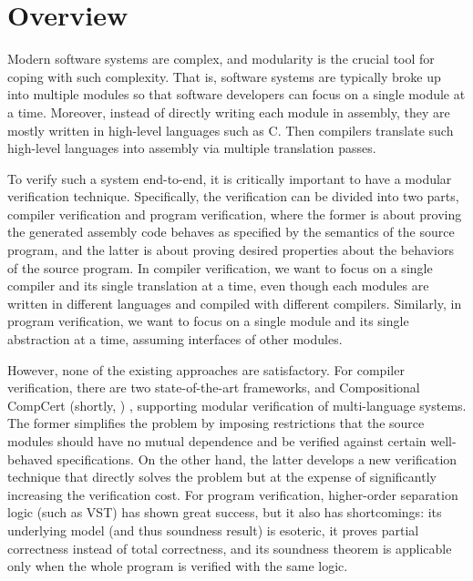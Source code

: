 \chapter{\;\;\;\;Overview}\label{sec:overview}


Modern software systems are complex, and modularity is the crucial tool for coping with such complexity.
That is, software systems are typically broke up into multiple modules so that software developers can focus on a single module at a time.
Moreover, instead of directly writing each module in assembly, they are mostly written in high-level languages such as C.
Then compilers translate such high-level languages into assembly via multiple translation passes.




To verify such a system end-to-end, it is critically important to have a modular verification technique.
Specifically, the verification can be divided into two parts, compiler verification and program verification,
where the former is about proving the generated assembly code behaves as specified by the semantics of the source program,
and the latter is about proving desired properties about the behaviors of the source program.
In compiler verification, we want to focus on a single compiler and its single translation at a time, even though each modules are written in different languages and compiled with different compilers.
Similarly, in program verification, we want to focus on a single module and its single abstraction at a time, assuming interfaces of other modules.




However, none of the existing approaches are satisfactory.
For compiler verification, there are two state-of-the-art frameworks, \ccx{} \cite{gu:dscal,wang:saccx} and Compositional CompCert (shortly, \ccc{}) \cite{beringer:isem,stewart:ccc},
supporting modular verification of multi-language systems. %
The former simplifies the problem by
imposing restrictions that the source modules should have no mutual
dependence and be verified against certain well-behaved
specifications. On the other hand, the latter develops a new
verification technique that directly solves the problem but at the
expense of significantly increasing the verification cost.
For program verification, higher-order separation logic (such as VST\cite{VST}) has shown great success, but it also has shortcomings:
its underlying model (and thus soundness result) is esoteric, it proves partial correctness instead of total correctness,
and its soundness theorem is applicable only when the whole program is verified with the same logic.








